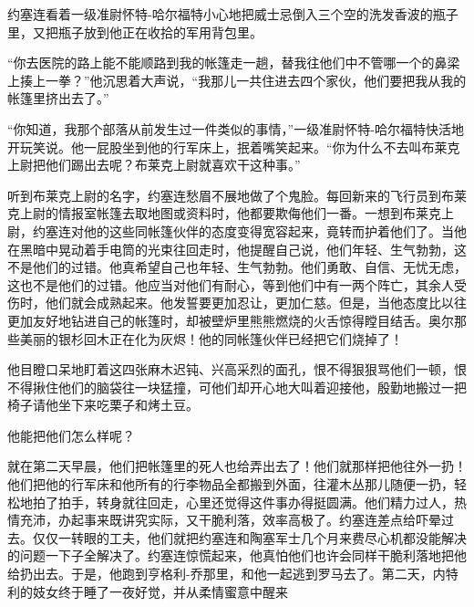     约塞连看着一级准尉怀特-哈尔福特小心地把威士忌倒入三个空的洗发香波的瓶子里，又把瓶子放到他正在收拾的军用背包里。

    “你去医院的路上能不能顺路到我的帐篷走一趟，替我往他们中不管哪一个的鼻梁上揍上一拳？”他沉思着大声说，“我那儿一共住进去四个家伙，他们要把我从我的帐篷里挤出去了。”

    “你知道，我那个部落从前发生过一件类似的事情，”一级准尉怀特-哈尔福特快活地开玩笑说。他一屁股坐到他的行军床上，抿着嘴笑起来。“你为什么不去叫布莱克上尉把他们踢出去呢？布莱克上尉就喜欢干这种事。”

    听到布莱克上尉的名字，约塞连愁眉不展地做了个鬼脸。每回新来的飞行员到布莱克上尉的情报室帐篷去取地图或资料时，他都要欺侮他们一番。一想到布莱克上尉，约塞连对他的这些同帐篷伙伴的态度变得宽容起来，竟转而护着他们了。当他在黑暗中晃动着手电筒的光束往回走时，他提醒自己说，他们年轻、生气勃勃，这不是他们的过错。他真希望自己也年轻、生气勃勃。他们勇敢、自信、无忧无虑，这也不是他们的过错。他应当对他们有耐心，等到他们中有一两个阵亡，其余人受伤时，他们就会成熟起来。他发誓要更加忍让，更加仁慈。但是，当他态度比以往更加友好地钻进自己的帐篷时，却被壁炉里熊熊燃烧的火舌惊得瞠目结舌。奥尔那些美丽的银杉回木正在化为灰烬！他的同帐篷伙伴已经把它们烧掉了！

    他目瞪口呆地盯着这四张麻木迟钝、兴高采烈的面孔，恨不得狠狠骂他们一顿，恨不得揪住他们的脑袋往一块猛撞，可他们却开心地大叫着迎接他，殷勤地搬过一把椅子请他坐下来吃栗子和烤土豆。

    他能把他们怎么样呢？

    就在第二天早晨，他们把帐篷里的死人也给弄出去了！他们就那样把他往外一扔！他们把他的行军床和他所有的行李物品全都搬到外面，往灌木丛那儿随便一扔，轻松地拍了拍手，转身就往回走，心里还觉得这件事办得挺圆满。他们精力过人，热情充沛，办起事来既讲究实际，又干脆利落，效率高极了。约塞连差点给吓晕过去。仅仅一转眼的工夫，他们就把约塞连和陶塞军士几个月来费尽心机都没能解决的问题一下子全解决了。约塞连惊慌起来，他真怕他们也许会同样干脆利落地把他给扔出去。于是，他跑到亨格利-乔那里，和他一起逃到罗马去了。第二天，内特利的妓女终于睡了一夜好觉，并从柔情蜜意中醒来
